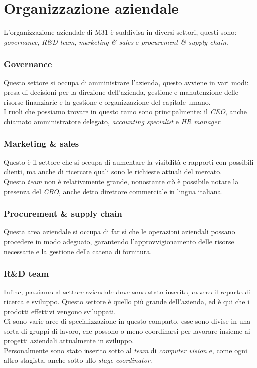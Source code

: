 \section{Organizzazione aziendale}\noindent
L'organizzazione aziendale di M31 è suddivisa in diversi settori, questi sono: \textit{governance}, \textit{R\&D team}, \textit{marketing \& sales} e \textit{procurement \& supply chain}.
\subsubsection*{Governance}\noindent
Questo settore si occupa di amministrare l'azienda, questo avviene in vari modi: presa di decisioni per la direzione dell'azienda, gestione e manutenzione delle risorse finanziarie e la gestione e organizzazione del capitale umano.\\
I ruoli che possiamo trovare in questo ramo sono principalmente: il \textit{CEO}, anche chiamato amministratore delegato, \textit{accounting specialist} e \textit{HR manager}.
\subsubsection*{Marketing \& sales}\noindent
Questo è il settore che si occupa di aumentare la visibilità e rapporti con possibili clienti, ma anche di ricercare quali sono le richieste attuali del mercato.\\
Questo \textit{team} non è relativamente grande, nonostante ciò è possibile notare la presenza del \textit{CBO}, anche detto direttore commerciale in lingua italiana.
\subsubsection*{Procurement \& supply chain}\noindent
Questa area aziendale si occupa di far sì che le operazioni aziendali possano procedere in modo adeguato, garantendo l'approvvigionamento delle risorse necessarie e la gestione della catena di fornitura.
\subsubsection*{R\&D team}\noindent
Infine, passiamo al settore aziendale dove sono stato inserito, ovvero il reparto di ricerca e sviluppo. Questo settore è quello più grande dell'azienda, ed è qui che i prodotti effettivi vengono sviluppati.\\
Ci sono varie aree di specializzazione in questo comparto, esse sono divise in una sorta di gruppi di lavoro, che possono o meno coordinarsi per lavorare insieme ai progetti aziendali attualmente in sviluppo.\\
Personalmente sono stato inserito sotto al \textit{team} di \textit{computer vision} e, come ogni altro stagista, anche sotto allo \textit{stage coordinator}.


